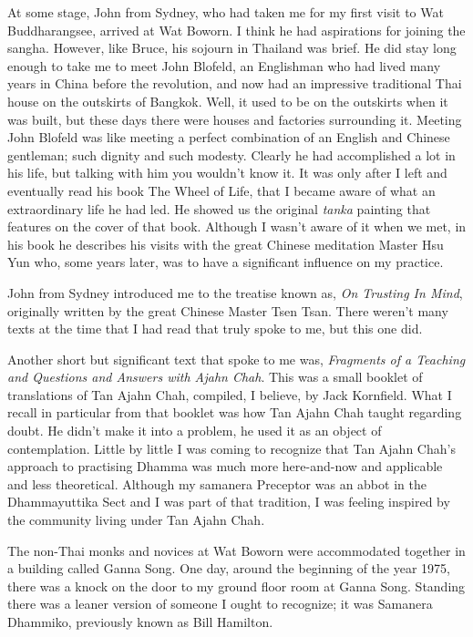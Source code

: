 At some stage, John from Sydney, who had taken me for my first visit to
Wat Buddharangsee, arrived at Wat Boworn. I think he had aspirations for
joining the sangha. However, like Bruce, his sojourn in Thailand was
brief. He did stay long enough to take me to meet John Blofeld, an
Englishman who had lived many years in China before the revolution, and
now had an impressive traditional Thai house on the outskirts of
Bangkok. Well, it used to be on the outskirts when it was built, but
these days there were houses and factories surrounding it. Meeting John
Blofeld was like meeting a perfect combination of an English and Chinese
gentleman; such dignity and such modesty. Clearly he had accomplished a
lot in his life, but talking with him you wouldn't know it. It was only
after I left and eventually read his book The Wheel of Life\cite{wheel},
that I became aware of what an extraordinary
life he had led. He showed us the original \emph{tanka} painting that
features on the cover of that book. Although I wasn't aware of it when
we met, in his book he describes his visits with the great Chinese meditation
Master Hsu Yun\cite{hsu-yun} who, some years later,
was to have a significant influence on my practice.

John from Sydney introduced me to the treatise known
as, \emph{On Trusting In Mind}, originally written by the great Chinese
Master Tsen Tsan. There weren't many texts at the time that I had read
that truly spoke to me, but this one did.

Another short but significant text that spoke to me was,
\emph{Fragments of a Teaching and Questions and Answers with Ajahn Chah}\cite{collected}.
This was a small booklet of translations of Tan Ajahn
Chah, compiled, I believe, by Jack Kornfield. What I recall in
particular from that booklet was how Tan Ajahn Chah taught regarding
doubt. He didn't make it into a problem, he used it as an object of
contemplation. Little by little I was coming to recognize that Tan Ajahn
Chah's approach to practising Dhamma was much more here-and-now and
applicable and less theoretical. Although my samanera Preceptor was an
abbot in the Dhammayuttika Sect and I was part of that tradition, I was
feeling inspired by the community living under Tan Ajahn Chah.

The non-Thai monks and novices at Wat Boworn were accommodated together
in a building called Ganna Song.
One day, around the beginning of the year 1975, there was a knock on the
door to my ground floor room at Ganna Song. Standing there was a
leaner version of someone I ought to recognize; it was Samanera
Dhammiko, previously known as Bill Hamilton.

